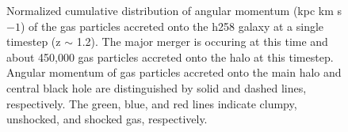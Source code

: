 \documentclass[]{emulateapj}
\begin{document}
\begin{figure}
\centerline{}
\caption[]{ Normalized cumulative distribution of angular momentum (kpc km s${{-1}}$) of the gas particles accreted onto the h258 galaxy at a single timestep (z $\sim$ 1.2). The major merger is occuring at this time and about 450,000 gas particles accreted onto the halo at this timestep. Angular momentum of gas particles accreted onto the main halo and central black hole are distinguished by solid and dashed lines, respectively. The green, blue, and red lines indicate clumpy, unshocked, and shocked gas, respectively.}
\label{hrh258angmom_merger2} 
\end{figure}
\end{document}
